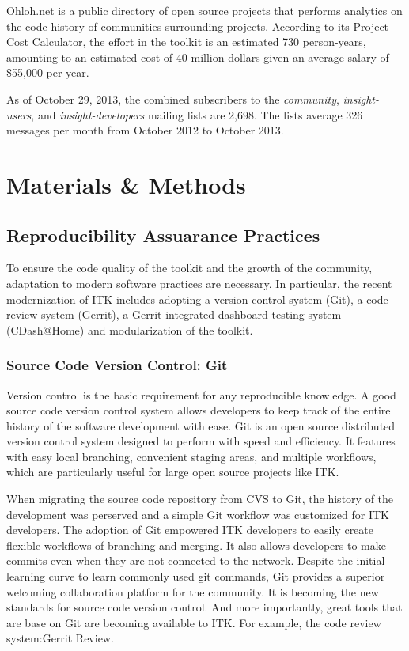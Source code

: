 \documentclass{frontiersENG} %
\begin{document}
Ohloh.net \cite{OhlohITK2013} is a public directory of open source projects
that performs analytics on the code history of communities surrounding
projects. According to its Project Cost Calculator, the effort in the toolkit
is an estimated 730 person-years, amounting to an estimated cost of 40 million
dollars given an average salary of \$55,000 per year.

As of October 29, 2013, the combined subscribers to the \textit{community},
\textit{insight-users}, and \textit{insight-developers} mailing lists are 2,698.
The lists average 326 messages per month from October 2012 to October 2013.


\section{Materials \& Methods}

\subsection{Reproducibility Assuarance Practices}

To ensure the code quality of the toolkit and the growth of the community,
adaptation to modern software practices are necessary. In particular, the
recent modernization of ITK includes adopting a version control system (Git),
 a code review system (Gerrit), a Gerrit-integrated dashboard testing system
(CDash@Home) and modularization of the toolkit.

\subsubsection{Source Code Version Control: Git} Version control is the basic
requirement for any reproducible knowledge. A good source code version control
system allows developers to keep track of the entire history of the software
development with ease. Git is an open source distributed version control system
designed to perform with speed and efficiency. It features with easy local
branching, convenient staging areas, and multiple workflows, which are
particularly useful for large open source projects like ITK.

When migrating the source code repository from CVS to Git, the history of the
development was perserved and a simple Git workflow was customized for ITK
developers.  The adoption of Git empowered ITK developers to easily create
flexible workflows of branching and merging. It also allows developers to make
commits even when they are not connected to the network. Despite the initial
learning curve to learn commonly used git commands, Git provides a superior
welcoming collaboration platform for the community. It is becoming the new
standards for source code version control. And more importantly, great tools that
are base on Git are becoming available to ITK. For example, the code review
system:Gerrit Review.
\end{document}
